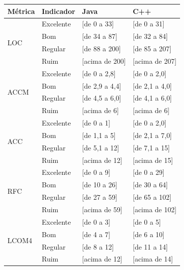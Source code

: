	\begin{table}[!ht]
	\begin{center}
	\begin{tabular}{ |l|l|l|l| }
		\hline
		Métrica & Indicador & Java & C++ \\ \hline
		\multirow{4}{*}{LOC} 
		 & Excelente & [de 0 a 33] & [de 0 a 31] \\
		 & Bom & [de 34 a 87] & [de 32 a 84] \\
		 & Regular & [de 88 a 200] & [de 85 a 207] \\
		 & Ruim & [acima de 200] & [acima de 207] \\ \hline
		 
		\multirow{4}{*}{ACCM} 
		 & Excelente & [de 0 a 2,8] & [de 0 a 2,0] \\
		 & Bom & [de 2,9 a 4,4] & [de 2,1 a 4,0] \\
		 & Regular & [de 4,5 a 6,0] & [de 4,1 a 6,0] \\
		 & Ruim & [acima de 6] & [acima de 6] \\ \hline
		 
		 
		\multirow{4}{*}{ACC} 
		 & Excelente & [de 0 a 1] & [de 0 a 2,0] \\
		 & Bom & [de 1,1 a 5] & [de 2,1 a 7,0] \\
		 & Regular & [de 5,1 a 12] & [de 7,1 a 15] \\
		 & Ruim & [acima de 12] & [acima de 15] \\ \hline
		 
		 
		\multirow{4}{*}{RFC} 
		 & Excelente & [de 0 a 9] & [de 0 a 29] \\
		 & Bom & [de 10 a 26] & [de 30 a 64] \\
		 & Regular & [de 27 a 59] & [de 65 a 102] \\
		 & Ruim & [acima de 59] & [acima de 102] \\ \hline
		 
		\multirow{4}{*}{LCOM4} 
		 & Excelente & [de 0 a 3] & [de 0 a 5] \\
		 & Bom & [de 4 a 7] & [de 6 a 10] \\
		 & Regular & [de 8 a 12] & [de 11 a 14] \\
		 & Ruim & [acima de 12] & [acima de 14] \\ \hline
		 

\end{tabular}
\end{center}
\end{table}
